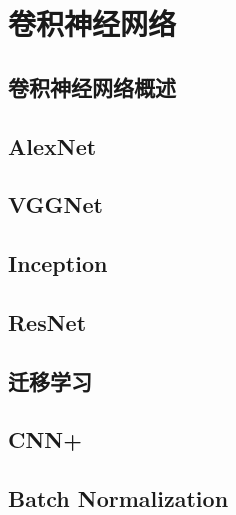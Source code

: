 \section{卷积神经网络}
\subsection{卷积神经网络概述}
\subsection{AlexNet}
\subsection{VGGNet}
\subsection{Inception}
\subsection{ResNet}
\subsection{迁移学习}
\subsection{CNN+}



\subsection{Batch Normalization}


